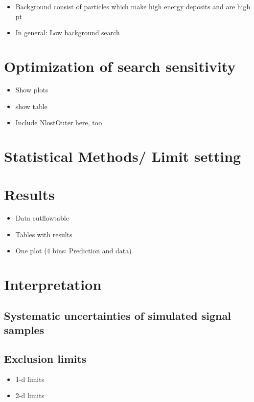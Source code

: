 \begin{itemize}
\item Background consist of particles which make high energy deposits and are high pt
\item In general: Low background search
\end{itemize}
\section{Optimization of search sensitivity}
\label{sec:Optimization}
\begin{itemize}
\item Show plots
\item show table
\item Include NlostOuter here, too
\end{itemize}

\section{Statistical Methods/ Limit setting}
\label{sec:LimitSetting}

\section{Results}
\label{sec:Results}
\begin{itemize}
\item Data cutflowtable
\item Tables with results
\item One plot (4 bins: Prediction and data)
\end{itemize}

\section{Interpretation}
\label{sec:Interpretation}
\subsection{Systematic uncertainties of simulated signal samples}
\subsection{Exclusion limits}
\begin{itemize}
\item 1-d limits
\item 2-d limits
\end{itemize}

